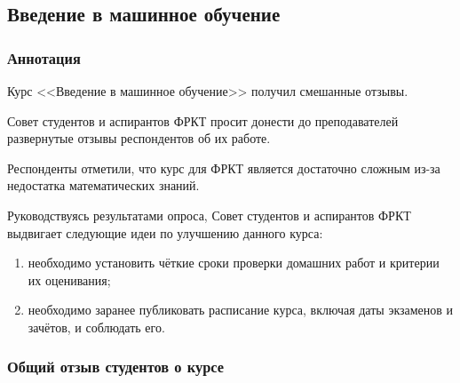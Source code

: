 \subsection{Введение в машинное обучение}
	
	\subsubsection{Аннотация}

		Курс <<Введение в машинное обучение>> получил смешанные отзывы.

		Совет студентов и аспирантов ФРКТ просит донести до преподавателей развернутые отзывы респондентов об их работе.
		
		Респонденты отметили, что курс для ФРКТ является достаточно сложным из-за недостатка математических знаний.

		Руководствуясь результатами опроса, Совет студентов и аспирантов ФРКТ выдвигает следующие идеи по улучшению данного курса:
		\begin{enumerate}
			\item необходимо установить чёткие сроки проверки домашних работ и критерии их оценивания;
			\item необходимо заранее публиковать расписание курса, включая даты экзаменов и зачётов, и соблюдать его.
		\end{enumerate}
				

	\subsubsection{Общий отзыв студентов о курсе}

